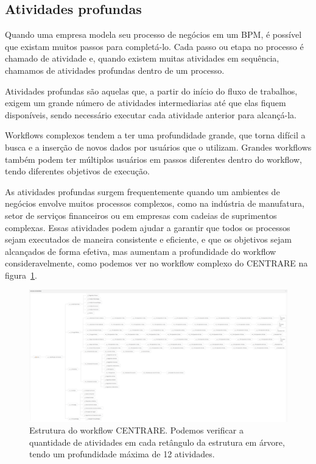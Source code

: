 \subsection{Atividades profundas}


Quando uma empresa modela seu processo de negócios em um BPM, é possível que existam muitos passos para completá-lo. Cada passo ou etapa no processo é chamado de atividade e, quando existem muitas atividades em sequência, chamamos de atividades profundas dentro de um processo.

Atividades profundas são aquelas que, a partir do início do fluxo de trabalhos, exigem um grande número de atividades intermediarias até que elas fiquem disponíveis, sendo necessário executar cada atividade anterior para alcançá-la.


Workflows complexos tendem a ter uma profundidade grande, que torna difícil a busca e a inserção de novos dados por usuários que o utilizam. Grandes workflows também podem ter múltiplos usuários em passos diferentes dentro do workflow, tendo diferentes objetivos de execução.

As atividades profundas surgem frequentemente quando um ambientes de negócios envolve muitos processos complexos, como na indústria de manufatura, setor de serviços financeiros ou em empresas com cadeias de suprimentos complexas. Essas atividades podem ajudar a garantir que todos os processos sejam executados de maneira consistente e eficiente, e que os objetivos sejam alcançados de forma efetiva, mas aumentam a profundidade do workflow consideravelmente, como podemos ver no workflow complexo do CENTRARE na figura~\ref{fig:centrareEstrutura}.

\begin{figure}
    \centering
    \includegraphics[width=1\textwidth]{imgs/CENTRARE/estrutura.png}
    \caption{Estrutura do workflow CENTRARE. Podemos verificar a quantidade de atividades em cada retângulo da estrutura em árvore, tendo um profundidade máxima de 12 atividades.}
    \label{fig:centrareEstrutura}
\end{figure}

